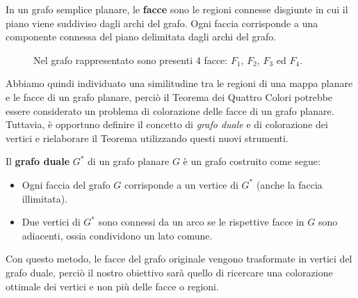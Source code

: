 \documentclass[a4paper,12pt,titlepage]{report}
\begin{document}
	\begin{dfn}
		In un grafo semplice planare, le {\bfseries facce} sono le regioni connesse disgiunte in cui il piano viene suddiviso dagli archi del grafo. Ogni faccia corrisponde a una componente connessa del piano delimitata dagli archi del grafo.
	\end{dfn}
	\begin{figure}[h!]
		\centering
		\vspace{0.5cm}
		\caption{Nel grafo rappresentato sono presenti 4 facce: $F_1$, $F_2$, $F_3$ ed $F_4$.}
	\end{figure}
	Abbiamo quindi individuato una similitudine tra le regioni di una mappa planare e le facce di un grafo planare, perciò il Teorema dei Quattro Colori potrebbe essere considerato un problema di colorazione delle facce di un grafo planare.
	\\Tuttavia, è opportuno definire il concetto di \emph{grafo duale} e di colorazione dei vertici e rielaborare il Teorema utilizzando questi nuovi strumenti.
	\begin{dfn}
		Il {\bfseries grafo duale} $G^*$ di un grafo planare $G$ è un grafo costruito come segue:
		\begin{itemize}
			\item Ogni faccia del grafo $G$ corrisponde a un vertice di $G^*$ (anche la faccia illimitata).
			\item Due vertici di $G^*$ sono connessi da un arco se le rispettive facce in $G$ sono adiacenti, ossia condividono un lato comune.
		\end{itemize}
	\end{dfn}
	\noindent Con questo metodo, le facce del grafo originale vengono trasformate in vertici del grafo duale, perciò il nostro obiettivo sarà quello di ricercare una colorazione ottimale dei vertici e non più delle facce o regioni.
\end{document}
